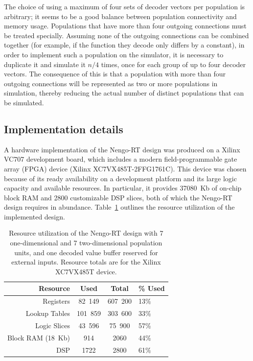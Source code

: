 \documentclass[english]{article}
\newcommand{\design}{Nengo-RT}
\begin{document}
The choice of using a maximum of four sets of decoder vectors per population is arbitrary; it seems to be a good balance between
population connectivity and memory usage. Populations that have more than four outgoing connections must be treated specially.
Assuming none of the outgoing connections can be combined together (for example, if the function they decode only differs by a constant),
in order to implement such a population on the simulator, it is necessary to duplicate it and simulate it
$n/4$ times, once for each group of up to four decoder vectors.
The consequence of this is that a population with more than
four outgoing connections will be represented as two or more populations in simulation, thereby reducing the actual number of
distinct populations that can be simulated.

\subsection{Implementation details}

A hardware implementation of the \design{} design was produced on a Xilinx VC707 development board, which includes a modern field-programmable gate array (FPGA)
device (Xilinx XC7VX485T-2FFG1761C). This device was chosen because of its ready availability on a development platform and its large logic capacity and available resources.
In particular, it provides 37080~Kb of on-chip block RAM and 2800 customizable DSP slices, both of which the Nengo-RT design requires in abundance.
Table~\ref{tbl:utilization} outlines the resource utilization of the implemented design.

\begin{table}
\begin{tabular}{|r|c|c|l|}
\hline
Resource & Used & Total & \% Used \\
\hline
\hline
Registers & 82~149 & 607~200 & 13\% \\
Lookup Tables & 101~859 & 303~600 & 33\% \\
Logic Slices & 43~596 & 75~900 & 57\% \\
Block RAM (18~Kb) & 914 & 2060 & 44\% \\
DSP & 1722 & 2800 & 61\% \\
\hline
\end{tabular}
\caption[\design{} resource utilization on VC707 development board.]
{Resource utilization of the \design{} design with 7 one-dimensional and 7 two-dimensional population units, and one decoded value buffer reserved for external inputs.
Resource totals are for the Xilinx XC7VX485T device.}
\label{tbl:utilization}
\end{table}
\end{document}
